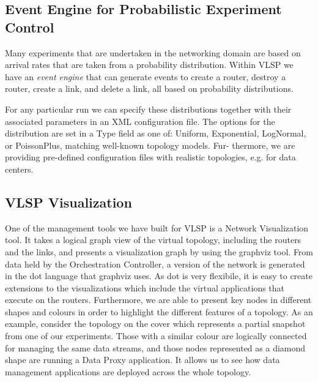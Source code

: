 \subsection{Event Engine for Probabilistic Experiment Control}

Many experiments that are undertaken in the networking domain are
based on arrival rates that are taken from a probability
distribution. Within VLSP we have an \emph{event engine} that can generate
events to create a router, destroy a router, create a link, and delete
a link, all based on probability distributions.

For any particular run
we can specify these distributions together with their associated
parameters in an XML configuration file. The options for the
distribution are set 
in a Type field as one of: Uniform, Exponential, LogNormal, or
PoissonPlus, matching well-known topology models. Fur- thermore, we
are providing pre-defined configuration files with realistic
topologies, e.g. for data centers. 

\subsection{VLSP Visualization}

One of the management tools we have built for VLSP is a Network
Visualization tool. It takes a logical graph view of the virtual
topology, including the routers and the links, and presents a
visualization graph by using the graphviz tool. From data held by the
Orchestration Controller, a version of the network is generated in the
dot language that graphviz uses. As dot is very flexibile, it is easy
to create extensions to the visualizations which include the virtual
applications that execute on the routers. Furthermore, we are able to
present key nodes in different shapes and colours in order to
highlight the different features of a topology. As an example,
consider the topology on the cover which represents a partial snapshot
from one of our experiments. Those with a similar colour are 
logically connected for managing the same data streams, and those
nodes represented as a diamond shape are running a Data Proxy
application. It allows us to see how data management applications are
deployed across the whole topology. 
